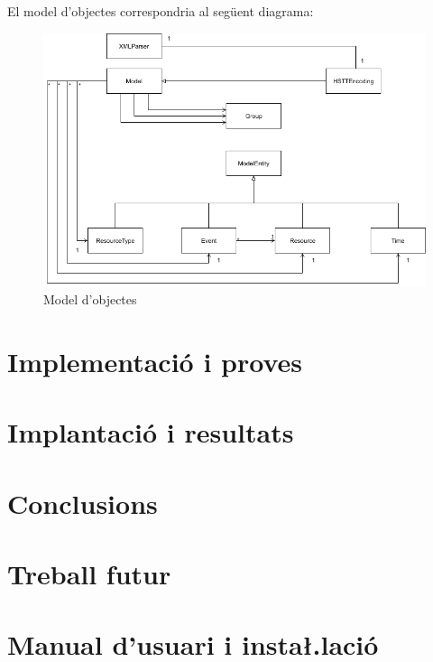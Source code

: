 \documentclass[11pt,a4paper,twoside]{report}
\begin{document}
  El model d'objectes correspondria al següent diagrama:
  \begin{figure}[ht!]
    \includegraphics[width=\textwidth]{Diagrames/UMLKai.png}
    \caption{Model d'objectes}
    \label{fig:ObjectModel}
  \end{figure}
  



  

  \chapter{Implementació i proves}
   
  
    
  \chapter{Implantació i resultats}
   
   

  \chapter{Conclusions}
  \chapter{Treball futur}

  \chapter{Manual d'usuari i insta\l.lació}
  \nocite{*}
  \printbibliography[heading=bibintoc]
  
  
  
\end{document}
